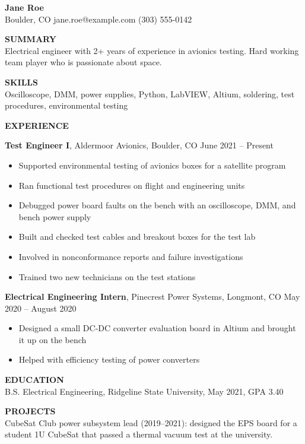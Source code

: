 \documentclass[10pt,letterpaper]{article}
\begin{document}
{\Large\bfseries Jane Roe}\\
Boulder, CO \textbar{} jane.roe@example.com \textbar{} (303) 555-0142

\medskip
\textbf{SUMMARY}\\
Electrical engineer with 2+ years of experience in avionics testing. Hard
working team player who is passionate about space.

\medskip
\textbf{SKILLS}\\
Oscilloscope, DMM, power supplies, Python, LabVIEW, Altium, soldering,
test procedures, environmental testing

\medskip
\textbf{EXPERIENCE}

\textbf{Test Engineer I}, Aldermoor Avionics, Boulder, CO \hfill June 2021 -- Present
\begin{itemize}
  \item Supported environmental testing of avionics boxes for a satellite program
  \item Ran functional test procedures on flight and engineering units
  \item Debugged power board faults on the bench with an oscilloscope, DMM, and bench power supply
  \item Built and checked test cables and breakout boxes for the test lab
  \item Involved in nonconformance reports and failure investigations
  \item Trained two new technicians on the test stations
\end{itemize}

\textbf{Electrical Engineering Intern}, Pinecrest Power Systems, Longmont, CO \hfill May 2020 -- August 2020
\begin{itemize}
  \item Designed a small DC-DC converter evaluation board in Altium and brought it up on the bench
  \item Helped with efficiency testing of power converters
\end{itemize}

\medskip
\textbf{EDUCATION}\\
B.S. Electrical Engineering, Ridgeline State University, May 2021, GPA 3.40

\medskip
\textbf{PROJECTS}\\
CubeSat Club power subsystem lead (2019--2021): designed the EPS board for a
student 1U CubeSat that passed a thermal vacuum test at the university.
\end{document}
